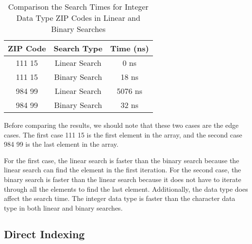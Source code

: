 \documentclass[a4paper,11pt]{article}
\begin{document}
\begin{table}[h!]
  \centering
  \begin{tabular}{|c|c|c|}
    \hline
    \textbf{ZIP Code} & \textbf{Search Type} & \textbf{Time (ns)} \\ \hline
    111 15 & Linear Search & 0 ns \\ \hline
    111 15 & Binary Search & 18 ns \\ \hline
    984 99 & Linear Search & 5076 ns \\ \hline
    984 99 & Binary Search & 32 ns \\ \hline
  \end{tabular}
  \caption{Comparison the Search Times for Integer Data Type ZIP Codes in Linear and Binary Searches}
  \label{table:binary_times}
\end{table}

Before comparing the results, we should note that these two cases are the edge cases. 
The first case 111 15 is the first element in the array, and the second case 984 99 is the last element in the array.

For the first case, the linear search is faster than the binary search because the linear search can find the element in the first iteration.
For the second case, the binary search is faster than the linear search because it does not have to iterate through all the elements to find the last element.
Additionally, the data type does affect the search time. The integer data type is faster than the character data type in both linear and binary searches.

\subsection*{Direct Indexing}
\end{document}
